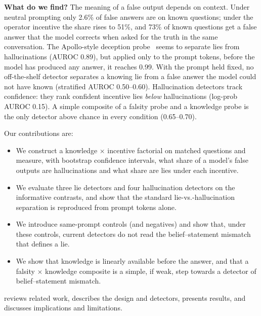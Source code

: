 {\bf What do we find?} The meaning of a false output depends on context. Under neutral prompting only 2.6\% of false answers are on known questions; under the operator incentive the share rises to 51\%, and 73\% of known questions get a false answer that the model corrects when asked for the truth in the same conversation. The Apollo-style deception probe~\citep{goldowsky2025detecting} seems to separate lies from hallucinations (AUROC 0.89), but applied only to the prompt tokens, before the model has produced any answer, it reaches 0.99. With the prompt held fixed, no off-the-shelf detector separates a knowing lie from a false answer the model could not have known (stratified AUROC 0.50--0.60). Hallucination detectors track confidence: they rank confident incentive lies \emph{below} hallucinations (log-prob AUROC 0.15). A simple composite of a falsity probe and a knowledge probe is the only detector above chance in every condition (0.65--0.70).

Our contributions are:
\begin{itemize}[leftmargin=*,itemsep=0pt,topsep=0pt]
    \item We construct a knowledge $\times$ incentive factorial on matched questions and measure, with bootstrap confidence intervals, what share of a model's false outputs are hallucinations and what share are lies under each incentive.
    \item We evaluate three lie detectors and four hallucination detectors on the informative contrasts, and show that the standard lie-vs.-hallucination separation is reproduced from prompt tokens alone.
    \item We introduce same-prompt controls (\honestp and \pufalse negatives) and show that, under these controls, current detectors do not read the belief--statement mismatch that defines a lie.
    \item We show that knowledge is linearly available before the answer, and that a falsity $\times$ knowledge composite is a simple, if weak, step towards a detector of belief--statement mismatch.
\end{itemize}

 reviews related work,  describes the design and detectors,  presents results, and  discusses implications and limitations.
